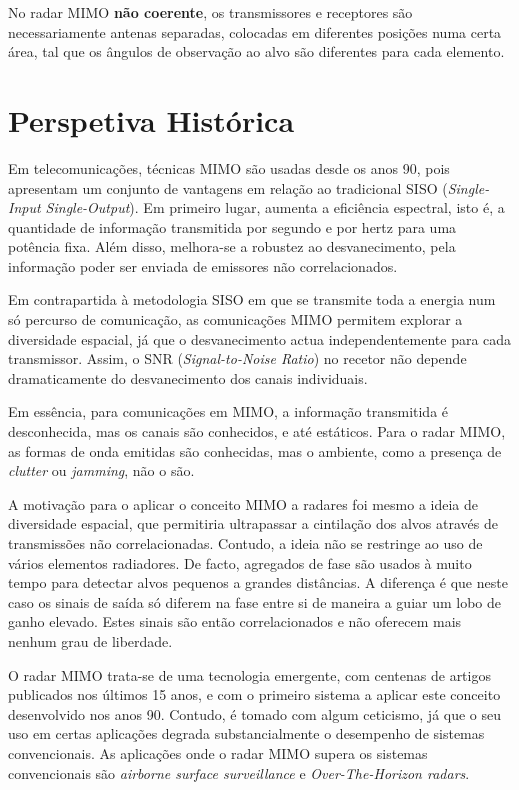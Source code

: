 \documentclass[purist,portuguese]{ist-report}
\begin{document}
No radar MIMO \textbf{não coerente}, os transmissores e receptores são necessariamente antenas separadas, colocadas em diferentes posições numa certa área, tal que os ângulos de observação ao alvo são diferentes para cada elemento.

\section{Perspetiva Histórica}

Em telecomunicações, técnicas MIMO são usadas desde os anos 90, pois apresentam um conjunto de vantagens em relação ao tradicional SISO (\textit{Single-Input Single-Output}).
Em primeiro lugar, aumenta a eficiência espectral, isto é, a quantidade de informação transmitida por segundo e por hertz para uma potência fixa. 
Além disso, melhora-se a robustez ao desvanecimento, pela informação poder ser enviada de emissores não correlacionados.

Em contrapartida à metodologia SISO em que se transmite toda a energia num só percurso de comunicação, as comunicações MIMO permitem explorar a diversidade espacial, já que o desvanecimento actua independentemente para cada transmissor.
Assim, o SNR (\textit{Signal-to-Noise Ratio}) no recetor não depende dramaticamente do desvanecimento dos canais individuais.

Em essência, para comunicações em MIMO, a informação transmitida é desconhecida, mas os canais são conhecidos, e até estáticos. Para o radar MIMO, as formas de onda emitidas são conhecidas, mas o ambiente, como a presença de \textit{clutter} ou \textit{jamming}, não o são.

A motivação para o aplicar o conceito MIMO a radares foi mesmo a ideia de diversidade espacial, que permitiria ultrapassar a cintilação dos alvos através de transmissões não correlacionadas.
Contudo, a ideia não se restringe ao uso de vários elementos radiadores.
De facto, agregados de fase  são usados à muito tempo para detectar alvos pequenos a grandes distâncias.
A diferença é que neste caso os sinais de saída só diferem na fase entre si de maneira a guiar um lobo de ganho elevado. 
Estes sinais são então correlacionados e não oferecem mais nenhum grau de liberdade.


O radar MIMO trata-se de uma tecnologia emergente, com centenas de artigos publicados nos últimos 15 anos, e com o primeiro sistema a aplicar este conceito desenvolvido nos anos 90.
Contudo, é tomado com algum ceticismo, já que o seu uso em certas aplicações degrada substancialmente o desempenho de sistemas convencionais.
As aplicações onde o radar MIMO supera os sistemas convencionais são \textit{airborne surface surveillance} e \textit{Over-The-Horizon radars}.
\end{document}
